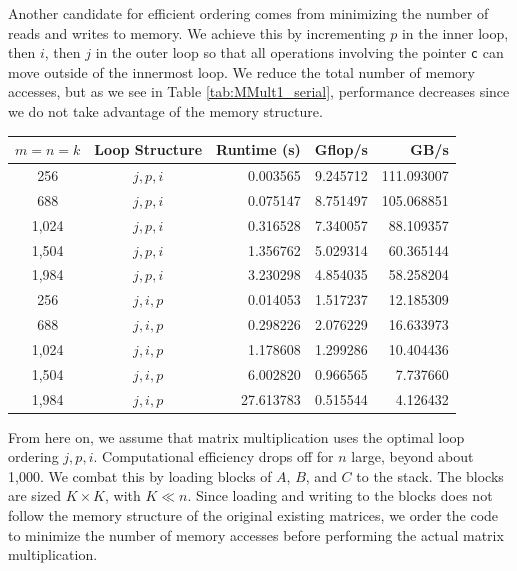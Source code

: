 \begin{questions}
\begin{solution}
    Another candidate for efficient ordering comes from minimizing the number of
    reads and writes to memory. We achieve this by incrementing $p$ in the inner
    loop, then $i$, then $j$ in the outer loop so that all operations involving
    the pointer \texttt c can move outside of the innermost loop. We reduce the total
    number of memory accesses, but as we see in Table \ref{tab:MMult1_serial},
    performance decreases since we do not take advantage of the memory structure.
        
    \begin{center}
    \begin{tabular}{|c|c|r|r|r|}
    \hline
    $m=n=k$ & Loop Structure & Runtime (s) & Gflop/s & GB/s \\
    \hline\hline
    256 & $j,p,i$ & 0.003565 &  9.245712 & 111.093007 \\
    \hline
    688 & $j,p,i$ & 0.075147 &  8.751497 & 105.068851 \\
    \hline
    1,024 & $j,p,i$ & 0.316528 &  7.340057 & 88.109357 \\
    \hline
    1,504 & $j,p,i$ & 1.356762 &  5.029314 & 60.365144 \\
    \hline
    1,984 & $j,p,i$ & 3.230298 &  4.854035 & 58.258204 \\
    \hline\hline
    256 & $j,i,p$ & 0.014053 &  1.517237 & 12.185309 \\
    \hline
    688 & $j,i,p$ & 0.298226 &  2.076229 & 16.633973 \\
    \hline
    1,024 & $j,i,p$ & 1.178608 &  1.299286 & 10.404436 \\
    \hline
    1,504 & $j,i,p$ & 6.002820 &  0.966565 &  7.737660 \\
    \hline
    1,984 & $j,i,p$ & 27.613783 &  0.515544 &  4.126432 \\
    \hline
    \end{tabular}
    \label{tab:MMult1_serial}
    \end{center}
    
    From here on, we assume that matrix multiplication uses the optimal loop ordering
    $j,p,i$. Computational efficiency drops off for $n$ large, beyond about 1,000. We combat
    this by loading blocks of $A$, $B$, and $C$ to the stack. The blocks are sized 
    $K \times K$, with $K \ll n$. Since loading and writing to the blocks does not 
    follow the memory structure of the original existing matrices, we order the code 
    to minimize the number of memory accesses before performing
    the actual matrix multiplication.
    

\end{solution}
\end{questions}
